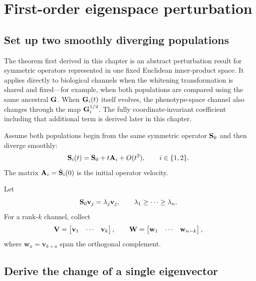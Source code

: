 \chapter{First-order eigenspace perturbation}

\section{Set up two smoothly diverging populations}

\begin{cautionbox}
The theorem first derived in this chapter is an abstract perturbation result for symmetric operators represented in one fixed Euclidean inner-product space. It applies directly to biological channels when the whitening transformation is shared and fixed---for example, when both populations are compared using the same ancestral \(\mathbf{G}\). When \(\mathbf{G}_i(t)\) itself evolves, the phenotype-space channel also changes through the map \(\mathbf{G}_i^{1/2}\). The fully coordinate-invariant coefficient including that additional term is derived later in this chapter.
\end{cautionbox}

Assume both populations begin from the same symmetric operator \(\mathbf{S}_0\) and then diverge smoothly:
\begin{equation}
\mathbf{S}_i(t)=\mathbf{S}_0+t\mathbf{A}_i+O(t^2),
\qquad i\in\{1,2\}.
\label{eq:operatorPaths}
\end{equation}
The matrix \(\mathbf{A}_i=\dot{\mathbf{S}}_i(0)\) is the initial operator velocity.

Let
\begin{equation}
\mathbf{S}_0\mathbf v_j=\lambda_j\mathbf v_j,
\qquad
\lambda_1\ge\cdots\ge\lambda_n.
\end{equation}
For a rank-\(k\) channel, collect
\begin{equation}
\mathbf{V}=
\begin{bmatrix}\mathbf v_1&\cdots&\mathbf v_k\end{bmatrix},
\qquad
\mathbf{W}=
\begin{bmatrix}\mathbf w_1&\cdots&\mathbf w_{n-k}\end{bmatrix},
\end{equation}
where \(\mathbf w_a=\mathbf v_{k+a}\) span the orthogonal complement.

\section{Derive the change of a single eigenvector}

